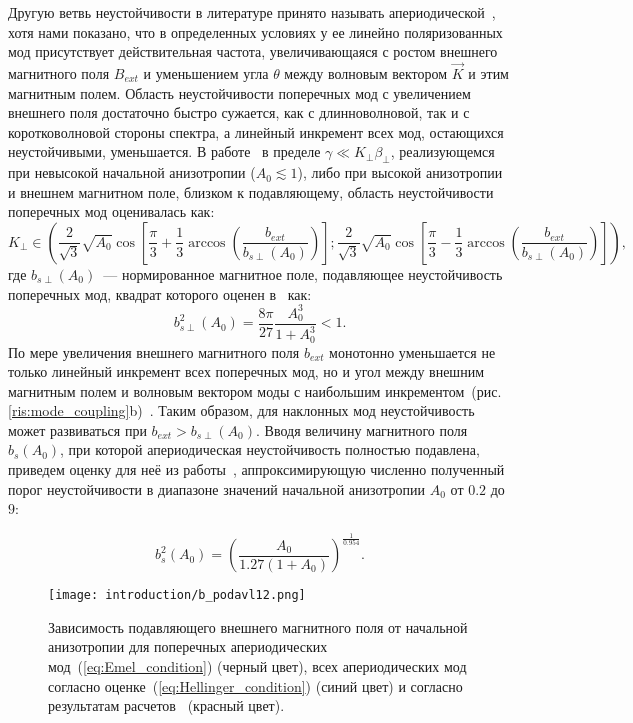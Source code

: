 Другую ветвь неустойчивости в литературе принято называть апериодической~\cite{???}, хотя нами показано, что в определенных условиях у ее линейно поляризованных мод присутствует действительная частота, увеличивающаяся с ростом внешнего магнитного поля $B_{ext}$ и уменьшением угла $\theta$ между волновым вектором $\vec{K}$ и этим магнитным полем. Область неустойчивости поперечных мод с увеличением внешнего поля достаточно быстро сужается,  как с длинноволновой, так и с коротковолновой стороны спектра, а линейный инкремент всех мод, остающихся неустойчивыми, уменьшается. В работе~\cite{Emelyanov2023_Radiophys} в пределе $\gamma\ll K_\perp\beta_\perp$, реализующемся при невысокой начальной анизотропии ($A_0\lesssim1$), либо при высокой анизотропии и внешнем магнитном поле, близком к подавляющему, область неустойчивости поперечных мод оценивалась как:
\begin{equation}
    K_\perp\in\left(\frac2{\sqrt{3}}\sqrt{A_0}\cos\left[\frac{\pi}3+\frac13\arccos\left(\frac{b_{ext}}{b_{s\perp}(A_0)}\right)\right];\frac2{\sqrt{3}}\sqrt{A_0}\cos\left[\frac{\pi}3-\frac13\arccos\left(\frac{b_{ext}}{b_{s\perp}(A_0)}\right)\right]\right),
    \label{eq:border_perp_inst}
\end{equation}
где $b_{s\perp}(A_0)$~--- нормированное магнитное поле, подавляющее неустойчивость поперечных мод, квадрат которого оценен в~\cite{Emelyanov2023_Radiophys} как:
\begin{equation}
    b_{s\perp}^2(A_0)=\frac{8\pi}{27}\frac{A_0^3}{1+A_0^3}<1.
    \label{eq:Emel_condition}
\end{equation}
По мере увеличения внешнего магнитного поля $b_{ext}$ монотонно уменьшается не только линейный инкремент всех поперечных мод, но и угол между внешним магнитным полем и волновым вектором моды с наибольшим инкрементом~(рис. \ref{ris:mode_coupling}b)~\cite{Moya2022,Li2000,Camporeale2008}. Таким образом, для наклонных мод неустойчивость может развиваться при $b_{ext}>b_{s\perp}(A_0)$. Вводя величину магнитного поля $b_s(A_0)$, при которой апериодическая неустойчивость полностью подавлена, приведем оценку для неё из работы~\cite{Hellinger2014}, аппроксимирующую численно полученный порог неустойчивости в диапазоне значений начальной анизотропии $A_0$ от $0.2$ до $9$:

\begin{equation}
    b_{s}^2(A_0)=\left(\frac{A_0}{1.27(1+A_0)}\right)^{\frac1{0.954}}.
    \label{eq:Hellinger_condition}
\end{equation}
\begin{figure}[h]

\texttt{[image: introduction/b\_podavl12.png]}
\centering
{}
\caption{Зависимость подавляющего внешнего магнитного поля от начальной анизотропии для поперечных апериодических мод~(\ref{eq:Emel_condition}) (черный цвет), всех апериодических мод согласно оценке~(\ref{eq:Hellinger_condition}) (синий цвет) и согласно результатам расчетов~\cite{Moya2022} (красный цвет).}

\label{ris:B_podavl}
\end{figure}

